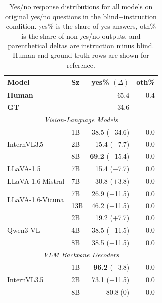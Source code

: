 \begin{table}[ht]
\centering
\small
\setlength{\tabcolsep}{4pt}
\renewcommand{\arraystretch}{0.95}
\caption{Yes/no response distributions for all models on original yes/no questions in the blind+instruction condition. yes\% is the share of yes answers, oth\% is the share of non-yes/no outputs, and parenthetical deltas are instruction minus blind. Human and ground-truth rows are shown for reference.}
\label{tab:yesno_distribution_all}
\begin{tabular}{llrr}
\toprule
\textbf{Model} & \textbf{Sz} & \textbf{yes\%} $(\Delta)$ & \textbf{oth\%} \\
\midrule
\textbf{Human} & -- & \cellcolor{teal!15}65.4 & 0.4 \\
\textbf{GT}    & -- & \cellcolor{red!12}34.6 & --- \\
\midrule
\multicolumn{4}{c}{\textit{Vision-Language Models}} \\
\midrule
\multirow[t]{3}{*}{InternVL3.5}
 & 1B & \cellcolor{red!12}38.5 {\scriptsize ($-$34.6)} & 0.0 \\
 & 2B & \cellcolor{red!12}15.4 {\scriptsize ($-$7.7)}  & 0.0 \\
 & 8B & \cellcolor{teal!15}\textbf{69.2} {\scriptsize ($+$15.4)} & 0.0 \\
LLaVA-1.5 & 7B & \cellcolor{red!12}15.4 {\scriptsize ($-$7.7)}  & 0.0 \\
LLaVA-1.6-Mistral & 7B & \cellcolor{red!12}30.8 {\scriptsize ($+$3.8)} & 0.0 \\
\multirow[t]{2}{*}{LLaVA-1.6-Vicuna}
 & 7B  & \cellcolor{red!12}26.9 {\scriptsize ($-$11.5)} & 0.0 \\
 & 13B & \cellcolor{red!12}\underline{46.2} {\scriptsize ($+$11.5)} & 0.0 \\
\multirow[t]{3}{*}{Qwen3-VL}
 & 2B  & \cellcolor{red!12}19.2 {\scriptsize ($+$7.7)}  & 0.0 \\
 & 4B  & \cellcolor{red!12}38.5 {\scriptsize ($+$11.5)} & 0.0 \\
 & 8B  & \cellcolor{red!12}38.5 {\scriptsize ($+$11.5)} & 0.0 \\
\midrule
\multicolumn{4}{c}{\textit{VLM Backbone Decoders}} \\
\midrule
\multirow[t]{3}{*}{InternVL3.5}
 & 1B & \cellcolor{teal!15}\textbf{96.2} {\scriptsize ($-$3.8)}  & 0.0 \\
 & 2B & \cellcolor{teal!15}73.1 {\scriptsize ($+$11.5)}  & 0.0 \\
 & 8B & \cellcolor{teal!15}80.8 {\scriptsize (0)}         & 0.0 \\

\end{tabular}
\end{table}
